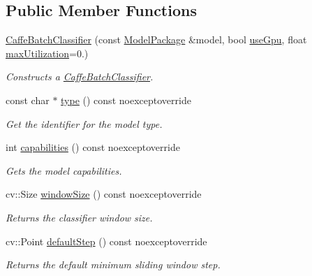 \subsection*{Public Member Functions}
\begin{DoxyCompactItemize}
\item 
\hyperlink{group___classification_module_ga8501a61fcaf492b0fe8b43b4e9440085}{Caffe\+Batch\+Classifier} (const \hyperlink{classdg_1_1deepcore_1_1classification_1_1_model_package}{Model\+Package} \&model, bool \hyperlink{group___classification_module_gaea38e3353458ab22d099d54411d6f868}{use\+Gpu}, float \hyperlink{group___classification_module_ga08d73772f04eb0553e4d787c69b34aa2}{max\+Utilization}=0.)
\begin{DoxyCompactList}\small\item\em Constructs a \hyperlink{classdg_1_1deepcore_1_1classification_1_1_caffe_batch_classifier}{Caffe\+Batch\+Classifier}. \end{DoxyCompactList}\item 
const char $\ast$ \hyperlink{classdg_1_1deepcore_1_1classification_1_1_caffe_batch_classifier_a9b0b78b3f39094f4c44364073c649be0}{type} () const noexceptoverride
\begin{DoxyCompactList}\small\item\em Get the identifier for the model type. \end{DoxyCompactList}\item 
int \hyperlink{classdg_1_1deepcore_1_1classification_1_1_caffe_batch_classifier_a957dde9717bc47fec977f8d1541a1daf}{capabilities} () const noexceptoverride
\begin{DoxyCompactList}\small\item\em Gets the model capabilities. \end{DoxyCompactList}\item 
cv\+::\+Size \hyperlink{classdg_1_1deepcore_1_1classification_1_1_caffe_batch_classifier_a7433ca559f73adce83d12eb84bf0121d}{window\+Size} () const noexceptoverride
\begin{DoxyCompactList}\small\item\em Returns the classifier window size. \end{DoxyCompactList}\item 
cv\+::\+Point \hyperlink{classdg_1_1deepcore_1_1classification_1_1_caffe_batch_classifier_a9a34ee36b62d9949494388ba4f44b47b}{default\+Step} () const noexceptoverride
\begin{DoxyCompactList}\small\item\em Returns the default minimum sliding window step. \end{DoxyCompactList}\item 

\end{DoxyCompactItemize}

